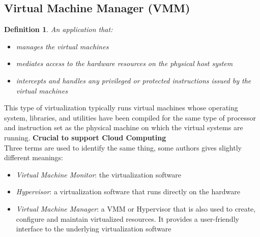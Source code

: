 \documentclass[10pt, oneside]{article}
\newtheorem{defn}{Definition}
\begin{document}
\subsection{Virtual Machine Manager (VMM)}
\begin{defn}
    An application that: \begin{itemize}
        \item manages the virtual machines
        \item mediates access to the hardware resources on the physical host
        system
        \item intercepts and handles any privileged or protected instructions
        issued by the virtual machines
    \end{itemize}
\end{defn}
This type of virtualization typically runs virtual machines whose operating system, libraries, and utilities have been compiled for the same type of processor and instruction set as the physical machine on which the virtual systems are running.
{\bf Crucial to support Cloud Computing}\\ \newline
Three terms are used to identify the same thing, some authors gives slightly different meanings:
\begin{itemize}
    \item {\sl Virtual Machine Monitor}: the virtualization software
    \item {\sl Hypervisor}: a virtualization software that runs directly on the hardware
    \item {\sl Virtual Machine Manager}: a VMM or Hypervisor that is also used to create, configure and maintain virtualized resources.
    It provides a user-friendly interface to the underlying virtualization software
\end{itemize}
\end{document}
